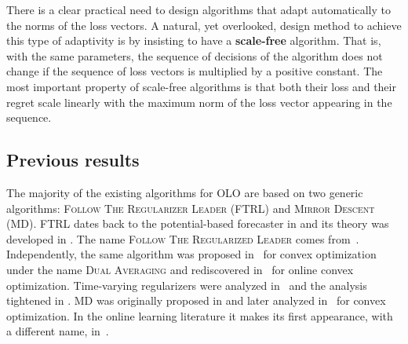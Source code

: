 \addtocounter{footnote}{-2}



There is a clear practical need to design algorithms that adapt automatically to
the norms of the loss vectors.  A natural, yet overlooked, design method to
achieve this type of adaptivity is by insisting to have a \textbf{scale-free}
algorithm.  That is, with the same parameters, the sequence of decisions of the
algorithm does not change if the sequence of loss vectors is multiplied by a
positive constant.  The most important property of scale-free algorithms is that
both their loss and their regret scale linearly with the maximum norm of the
loss vector appearing in the sequence.

\subsection{Previous results}

The majority of the existing algorithms for OLO are based on two generic
algorithms: \textsc{Follow The Regularizer Leader} (\textsc{FTRL}) and
\textsc{Mirror Descent} (\textsc{MD}). \textsc{FTRL} dates back to the
potential-based forecaster in \cite[Chapter~11]{Cesa-Bianchi-Lugosi-2006} and
its theory was developed in \cite{Shalev-Shwartz-2007}.  The name \textsc{Follow
The Regularized Leader} comes from~\cite{Abernethy-Hazan-Rakhlin-2008}.
Independently, the same algorithm was proposed in~\cite{Nestorov-2009} for
convex optimization under the name \textsc{Dual Averaging} and rediscovered
in~\cite{Xiao-2010} for online convex optimization. Time-varying regularizers
were analyzed in~\cite{Duchi-Hazan-Singer-2011} and the analysis tightened in
\cite{Orabona-Crammer-Cesa-Bianchi-2014}. \textsc{MD} was originally proposed in
\cite{Nemirovski-Yudin-1983} and later analyzed in~\cite{Beck-Teboulle-2003} for
convex optimization. In the online learning literature it makes its first
appearance, with a different name, in~\cite{Kivinen-Warmuth-1997}.

